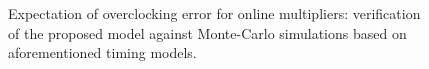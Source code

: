 \documentclass{acm_proc_article-sp}
\begin{document}
\begin{figure}[t]
  \centering
  \vspace{-2ex}
  \caption{Expectation of overclocking error for online multipliers: verification of the proposed model against Monte-Carlo simulations based on aforementioned timing models.}
  \label{Fig:ModelVerification}
  \vspace{-2ex}
\end{figure}
\end{document}
